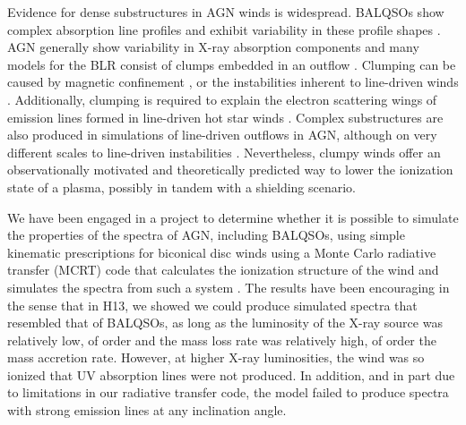 \documentclass[useAMS,usenatbib]{mn2e_x}
\begin{document}
Evidence for dense substructures in AGN winds is widespread.
BALQSOs show complex absorption line profiles \citep{ganguly2006, simonhamann2010}
and exhibit variability in these profile shapes \citep{capellupo2011,capellupo2012,capellupo2014}.
AGN generally show variability in X-ray absorption components \citep[e.g.][]{risaliti2002}
and many models for the BLR consist of clumps embedded in an outflow 
\citep{krolik1981, emmering1992, dekool1995, cassidyraine1996}.
Clumping can be caused by magnetic confinement \citep{dekool1995},
or the instabilities inherent to line-driven winds 
\citep{lucysolomon1970,macgregor1979,carlberg1980,owockirybicki1984,owockirybicki1985}.
Additionally, clumping is required to explain the electron scattering wings of emission lines formed
in line-driven hot star winds \citep{hillier1991eswingsmodel}. Complex substructures 
are also produced in simulations of line-driven 
outflows in AGN, although on very different scales to line-driven instabilities 
\citep{PSK2000,PK04,progakurosawa2010,proga2014}.  
Nevertheless, clumpy winds offer an observationally motivated and theoretically 
predicted way to lower the ionization state of a plasma, possibly in tandem
with a shielding scenario. 

We have been engaged in a project to determine whether it is possible to simulate the properties of the spectra of AGN, including BALQSOs, using simple kinematic prescriptions for biconical disc winds using a Monte Carlo radiative transfer (MCRT) code that calculates the ionization structure of the wind and simulates the spectra from such a system \citep[][hereafter H13 and H14]{simlong2008,sim2010,higginbottom2013,H14}.  The results have been encouraging in the sense that in H13, we showed we could produce simulated spectra that resembled that of BALQSOs, as long as the luminosity of the X-ray source was relatively low, of order  and the mass loss rate was relatively high, of order the mass accretion rate.  However, at higher X-ray luminosities, the wind was so ionized that UV absorption lines were not produced.  In addition, and in part due to limitations in our radiative transfer code, the model failed to produce spectra with strong emission lines at any inclination angle.  
\end{document}
